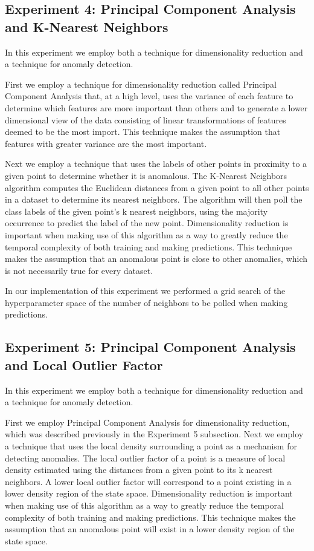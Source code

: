 \documentclass[conference]{IEEEtran}
\begin{document}
\subsection*{Experiment 4: Principal Component Analysis and K-Nearest Neighbors}

In this experiment we employ both a technique for dimensionality reduction and a technique for anomaly detection.

First we employ a technique for dimensionality reduction called Principal Component Analysis that, at a high level, uses the variance of each feature to determine which features are more important than others and to generate a lower dimensional view of the data consisting of linear transformations of features deemed to be the most import. This technique makes the assumption that features with greater variance are the most important.

Next we employ a technique that uses the labels of other points in proximity to a given point to determine whether it is anomalous. The K-Nearest Neighbors algorithm computes the Euclidean distances from a given point to all other points in a dataset to determine its nearest neighbors. The algorithm will then poll the class labels of the given point's k nearest neighbors, using the majority occurrence to predict the label of the new point. Dimensionality reduction is important when making use of this algorithm as a way to greatly reduce the temporal complexity of both training and making predictions. This technique makes the assumption that an anomalous point is close to other anomalies, which is not necessarily true for every dataset.

In our implementation of this experiment we performed a grid search of the hyperparameter space of the number of neighbors to be polled when making predictions.

\subsection*{Experiment 5: Principal Component Analysis and Local Outlier Factor}

In this experiment we employ both a technique for dimensionality reduction and a technique for anomaly detection.

First we employ Principal Component Analysis for dimensionality reduction, which was described previously in the Experiment 5 subsection. Next we employ a technique that uses the local density surrounding a point as a mechanism for detecting anomalies. The local outlier factor of a point is a measure of local density estimated using the distances from a given point to its k nearest neighbors. A lower local outlier factor will correspond to a point existing in a lower density region of the state space. Dimensionality reduction is important when making use of this algorithm as a way to greatly reduce the temporal complexity of both training and making predictions.  This technique makes the assumption that an anomalous point will exist in a lower density region of the state space.
\end{document}
